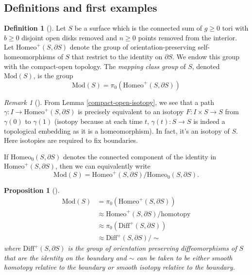 \documentclass[reqno]{amsart}
\newtheorem{proposition}[theorem]{Proposition}
\theoremstyle{definition}
\newtheorem{definition}[theorem]{Definition}
\theoremstyle{remark}
\newtheorem*{remark}{Remark}
\newcommand{\Mod}{{\mathrm{Mod}}}
\newcommand{\Homeo}{{\mathrm{Homeo}}}
\begin{document}
\subsection{Definitions and first examples}

\begin{definition}[]
    Let $S$ be a surface which is the connected sum of $g\ge 0$ 
    tori with $b \ge 0$ disjoint open disks removed and
    $n \ge 0$ points removed from the interior. Let
    $\Homeo^{+} \left( S, \partial S \right)$ denote the group
    of orientation-preserving self-homeomorphisms of $S$ that
    restrict to the identity on $\partial S$. We endow this
    group with the compact-open topology.
    The \textit{mapping class group} of  $S$, denoted
    $\Mod (S)$, is the group
    \[
    \Mod(S) = \pi_0 \left( \Homeo^{+} \left( S, \partial S
    \right) \right) 
    \] 


\begin{remark}[]
    From Lemma \ref{compact-open-isotopy}, we
    see that a path $\gamma \colon I \to 
    \Homeo^{+}\left( S, \partial S \right) $
    is precisely equivalent to an isotopy 
    $F \colon I \times S \to S$ from
    $\gamma(0)$ to $\gamma(1)$ (isotopy because at each
    time $t$, $\gamma(t) \colon S \to S$ is indeed a topological
    embedding as it is a homeomorphism). In fact, it's an isotopy
    of $S$. Here isotopies are required to fix
    boundaries.
\end{remark}





    If
    $\Homeo_0 (S, \partial S)$ denotes the connected component of
    the identity in $\Homeo^{+}\left( S, \partial S \right) $, then
    we can equivalently write
    \[
    \Mod (S) = \Homeo^{+} \left( S, \partial S \right) /
    \Homeo_0 \left( S, \partial S \right) .
    \] 
\end{definition}

\begin{proposition}[]
    \begin{align*}
        \Mod (S) 
        &= \pi_0 \left( \Homeo^{+} \left( S, \partial S \right) 
        \right) \\
        &\approx \Homeo^{+}\left( S, \partial S \right) /
        \text{homotopy}\\
        &\approx \pi_0 \left( \mathrm{Diff}^{+} \left( 
        S, \partial S \right)  \right) \\
        &\approx \textrm{Diff}^{+}\left( S, \partial S \right) /
        \sim
    \end{align*}
    where $\mathrm{Diff}^{+}\left( S, \partial S \right) $ is the group of
    orientation preserving diffeomorphisms of $S$ that are the
    identity on the boundary and $\sim$ can be taken to be either
    smooth homotopy relative to the boundary or smooth isotopy relative to the
    boundary.
\end{proposition}
\end{document}
